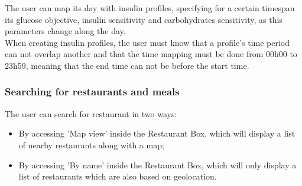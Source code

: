 The user can map its day with insulin profiles, specifying for a certain timespan its glucose objective, insulin sensitivity and carbohydrates sensitivity, as this parameters
change along the day.\\

When creating insulin profiles, the user must know that a profile's time period can not overlap another and that the time mapping must be done from 00h00 to 23h59, meaning that
the end time can not be before the start time.

\subsubsection{Searching for restaurants and meals}

The user can search for restaurant in two ways:
\begin{itemize}
    \item By accessing 'Map view' inside the Restaurant Box, which will display a list of nearby restaurants along with a map;
    \item By accessing 'By name' inside the Restaurant Box, which will only display a list of restaurants which are also based
    on geolocation.
\end{itemize}

